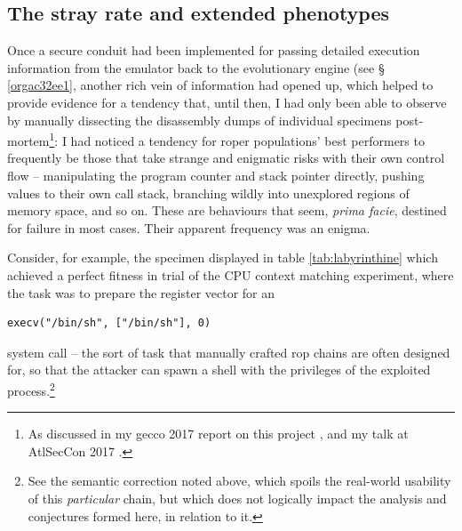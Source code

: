\documentclass[12pt,glossary]{dalthesis}
\begin{document}
\subsection{The stray rate and extended phenotypes}
\label{sec:orgcdd9f6c}
\label{org67dfa95}

Once a secure conduit had been implemented for passing detailed execution
information from the emulator back to the evolutionary engine (see \S
\ref{orgac32ee1},
another rich vein of information had opened up, which helped to provide evidence for a
tendency that, until then, I had only been able to observe by manually
dissecting the disassembly dumps of individual specimens post-mortem\footnote{As discussed in my \gls{gecco} 2017 report on this project \cite{fraser17_gecco},
  and my talk at AtlSecCon 2017 \cite{fraser17_atlseccon}.}: I had noticed a tendency for \gls{roper} populations' best
performers to frequently be those that take strange and enigmatic risks with their own
control flow -- manipulating the program counter and stack pointer directly,
pushing values to their own call stack, branching wildly into unexplored regions
of memory space, and so on. These are behaviours that seem, \emph{prima facie}, destined
for failure in most cases. Their apparent frequency was an enigma. 

Consider, for example, the specimen displayed in 
table \ref{tab:labyrinthine} which
achieved a perfect fitness in trial of the CPU context matching experiment,
where the task was to prepare the register vector for an
\begin{verbatim}
execv("/bin/sh", ["/bin/sh"], 0)
\end{verbatim}
system call -- the sort of task that manually crafted \gls{rop} chains are often
designed for, so that the attacker can spawn a shell with the privileges of the
exploited process.\footnote{See the semantic correction noted above, which 
  spoils the real-world usability of this \emph{particular} chain, but which
  does not logically impact the analysis and conjectures formed here,
  in relation to it.}
\end{document}
